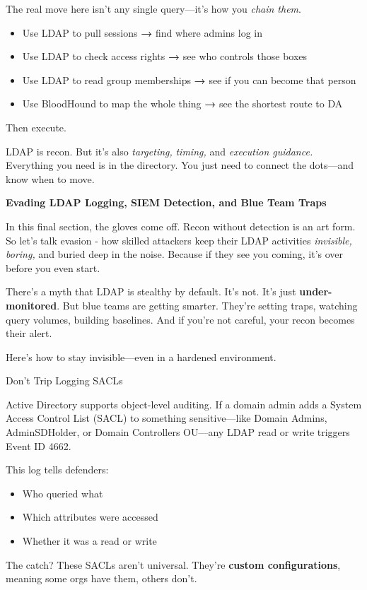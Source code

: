The real move here isn’t any single query—it’s how you \textit{chain them}.

\begin{itemize}
    \item Use LDAP to pull sessions \textbf{→} find where admins log in
    \item Use LDAP to check access rights \textbf{→} see who controls those boxes
    \item Use LDAP to read group memberships \textbf{→} see if you can become that person
    \item Use BloodHound to map the whole thing \textbf{→} see the shortest route to DA

\end{itemize}
Then execute.

LDAP is recon. But it’s also \textit{targeting,} \textit{timing,} and \textit{execution guidance.} Everything you need is in the directory. You just need to connect the dots—and know when to move.

\textbf{Evading LDAP Logging, SIEM Detection, and Blue Team Traps}

In this final section, the gloves come off. Recon without detection is an art form. So let’s talk evasion - how skilled attackers keep their LDAP activities \textit{invisible, boring, }and buried deep in the noise. Because if they see you coming, it’s over before you even start.

There’s a myth that LDAP is stealthy by default. It’s not. It’s just \textbf{under-monitored}. But blue teams are getting smarter. They’re setting traps, watching query volumes, building baselines. And if you’re not careful, your recon becomes their alert.

Here’s how to stay invisible—even in a hardened environment.

Don’t Trip Logging SACLs

Active Directory supports object-level auditing. If a domain admin adds a System Access Control List (SACL) to something sensitive—like Domain Admins, AdminSDHolder, or Domain Controllers OU—any LDAP read or write triggers Event ID 4662.

This log tells defenders:

\begin{itemize}
    \item Who queried what

    \item Which attributes were accessed

    \item Whether it was a read or write

\end{itemize}
The catch? These SACLs aren’t universal. They’re \textbf{custom configurations}, meaning some orgs have them, others don’t.

